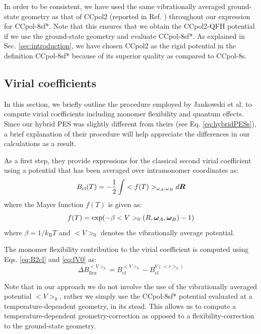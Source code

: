             In order to be consistent, we have used the same vibrationally averaged ground-state geometry as that of CCpol2 (reported in Ref. \cite{Gora2014}) throughout our expression for CCpol-8sf*. Note that this ensures that we obtain the CCpol2-QFH potential if we use the ground-state geometry and evaluate CCpol-8sf*. As explained in Sec. \ref{sec:introduction}, we have chosen CCpol2 as the rigid potential in the definition CCpol-8sf* because of its superior quality as compared to CCpol-8s.

        \subsection{Virial coefficients}
            In this section, we briefly outline the procedure employed by Jankowski et al. \cite{Jankowski2015} to compute virial coefficients including monomer flexibility and quantum effects. Since our hybrid PES was slightly different from theirs (see Eq. \eqref{eq:hybridPESs}), a brief explanation of their procedure will help appreciate the differences in our calculations as a result.

            As a first step, they provide expressions for the classical second virial coefficient using a potential that has been averaged over intramonomer coordinates as:
            \begin{equation}
                \label{eq:B2cl}
                B_{\text{cl}} (T) = -\displaystyle\frac{1}{2} \int <f(T)>_{\omega_A, \omega_B} d{\boldsymbol {R}}
            \end{equation}
            where the Mayer function $f(T)$ is given as:
            \begin{equation}
                \label{eq:fV0}
                f(T) = \exp ( -\beta <V>_0 (R, {\boldsymbol {\omega}}_A, {\boldsymbol {\omega}}_B) - 1)
            \end{equation}
            where $\beta = 1/k_\text{B} T$ and $<V>_0$ denotes the vibrationally average potential.

            The monomer flexibility contribution to the virial coefficient is computed using Eqs. \eqref{eq:B2cl}  and \eqref{eq:fV0} as:
            \begin{equation}
                \label{eq:deltaBFlex}
                \Delta B_\text{flex}^{<V>_0} = B_\text{cl}^{<V>_0} -  B_\text{cl}^{V(<r>_0)}
            \end{equation}

            Note that in our approach we do not involve the use of the vibrationally averaged potential $<V>_0$, rather we simply use the CCpol-8sf* potential evaluated at a temperature-dependent geometry, in its stead. This allows us to compute a temperature-dependent geometry-correction as opposed to a flexibility-correction to the ground-state geometry.

